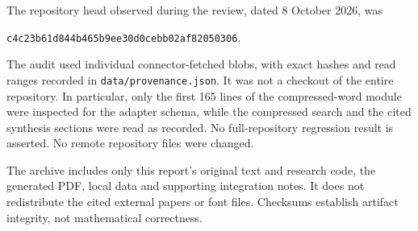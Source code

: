 \documentclass[11pt,letterpaper]{article}
\theoremstyle{definition}
\begin{document}
The repository head observed during the review, dated 8 October 2026, was
\begin{center}\small
\texttt{c4c23b61d844b465b9ee30d0cebb02af82050306}.
\end{center}
The audit used individual connector-fetched blobs, with exact hashes and
read ranges recorded in \texttt{data/provenance.json}. It was not a checkout
of the entire repository. In particular, only the first 165 lines of the
compressed-word module were inspected for the adapter schema, while the
compressed search and the cited synthesis sections were read as recorded.
No full-repository regression result is asserted. No remote repository
files were changed.

The archive includes only this report's original text and research code,
the generated PDF, local data and supporting integration notes. It does not
redistribute the cited external papers or font files. Checksums establish
artifact integrity, not mathematical correctness.
\end{document}
